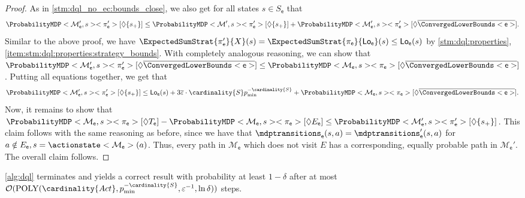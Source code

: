 \documentclass{theoretics}
\newcommand{\MDP}{\mathcal{M}}
\newcommand{\States}{S}
\newcommand{\Actions}{Act}
\newcommand{\strategy}{\pi}
\newcommand{\reach}{\Diamond}
\newcommand{\lowerbound}{\mathsf{Lo}}
\newcommand{\targetstate}{s_+}
\newcommand{\targetset}{T}
\newcommand{\updatestep}{{\overline{\varepsilon}}}
\newcommand{\algoepisode}{\mathsf{e}}
\begin{document}
\begin{proof}
	As in \cref{stm:dql_no_ec:bounds_close}, we also get for all states $s \in \States_\algoepisode$ that
	\begin{equation*}
		\ProbabilityMDP<\MDP'_\algoepisode, s><\strategy'_\algoepisode>[\reach \{\targetstate\}] \leq \ProbabilityMDP<\MDP', s><\strategy'_\algoepisode>[\reach \{\targetstate\}] + \ProbabilityMDP<\MDP'_\algoepisode, s><\strategy'_\algoepisode>[\reach \overline{\ConvergedLowerBounds<\algoepisode>}].
	\end{equation*}
	Similar to the above proof, we have $\ExpectedSumStrat{\strategy'_\algoepisode}{X}(s) = \ExpectedSumStrat{\strategy_\algoepisode}{\lowerbound_\algoepisode}(s) \leq \lowerbound_\algoepisode(s)$ by \cref{stm:dql:properties}, \cref{item:stm:dql:properties:strategy_bounds}.
	With completely analogous reasoning, we can show that $\ProbabilityMDP<\MDP'_\algoepisode, s><\strategy'_\algoepisode>[\reach \overline{\ConvergedLowerBounds<\algoepisode>}] \leq \ProbabilityMDP<\MDP_\algoepisode, s><\strategy_\algoepisode>[\reach \overline{\ConvergedLowerBounds<\algoepisode>}]$.
	Putting all equations together, we get that
	\begin{equation*}
		\ProbabilityMDP<\MDP'_\algoepisode, s><\strategy'_\algoepisode>[\reach \{\targetstate\}] \leq \lowerbound_\algoepisode(s) + 3 \updatestep \cdot \cardinality{\States} p_{\min}^{-\cardinality{\States}} + \ProbabilityMDP<\MDP_\algoepisode, s><\strategy_\algoepisode>[\reach \overline{\ConvergedLowerBounds<\algoepisode>}].
	\end{equation*}
	Now, it remains to show that $\ProbabilityMDP<\MDP_\algoepisode, s><\strategy_\algoepisode>[\reach \targetset_\algoepisode] - \ProbabilityMDP<\MDP_\algoepisode, s><\strategy_\algoepisode>[\reach E_\algoepisode] \leq \ProbabilityMDP<\MDP'_\algoepisode, s><\strategy'_\algoepisode>[\reach \{\targetstate\}]$.
	This claim follows with the same reasoning as before, since we have that $\mdptransitions_\algoepisode(s, a) = \mdptransitions'_\algoepisode(s, a)$ for $a \notin E_\algoepisode, s = \actionstate<\MDP_\algoepisode>(a)$.
	Thus, every path in $\MDP_\algoepisode$ which does not visit $E$ has a corresponding, equally probable path in $\MDP_\algoepisode'$.
	The overall claim follows. 
\end{proof}

\begin{theorem} \label{stm:dql_correct}
	\cref{alg:dql} terminates and yields a correct result with probability at least $1 - \delta$ after at most $\mathcal{O}(\mathrm{POLY}(\cardinality{\Actions}, p_{\min}^{-\cardinality{\States}}, \varepsilon^{-1}, \ln \delta))$ steps.
\end{theorem}
\end{document}
